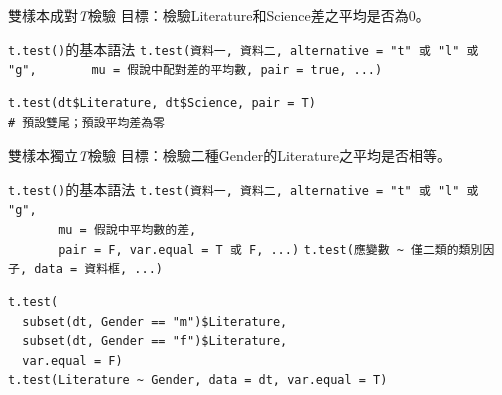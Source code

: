 \documentclass[12pt, aspectratio=43]{beamer}
\begin{document}
\begin{frame}[fragile]{雙樣本成對\emph{T}檢驗}
目標：檢驗Literature和Science差之平均是否為0。
\begin{block}{\texttt{t.test()}的基本語法}
\verb+t.test(資料一, 資料二, alternative = "t" 或 "l" 或 "g",+
\verb+       mu = 假說中配對差的平均數, pair = true, ...)+
\end{block}
\begin{verbatim}
t.test(dt$Literature, dt$Science, pair = T)
# 預設雙尾；預設平均差為零
\end{verbatim}
\end{frame}


\begin{frame}[fragile]{雙樣本獨立\emph{T}檢驗}
目標：檢驗二種Gender的Literature之平均是否相等。
\begin{block}{\texttt{t.test()}的基本語法}
\verb+t.test(資料一, 資料二, alternative = "t" 或 "l" 或 "g",+\\
\verb+       mu = 假說中平均數的差, +\\
\verb+       pair = F, var.equal = T 或 F, ...)+
\verb+t.test(應變數 ~ 僅二類的類別因子, data = 資料框, ...)+
\end{block}
\begin{verbatim}
t.test(
  subset(dt, Gender == "m")$Literature,
  subset(dt, Gender == "f")$Literature,
  var.equal = F)
t.test(Literature ~ Gender, data = dt, var.equal = T)
\end{verbatim}
\end{frame}
%
\end{document}
